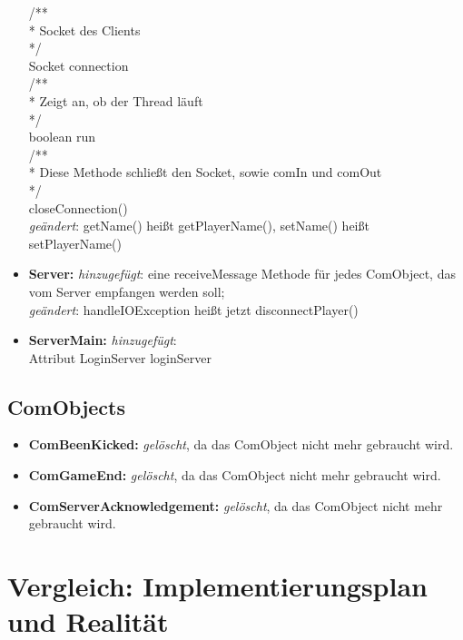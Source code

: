 \documentclass{article}
\begin{document}
\begin{itemize}
/**\\
 * Socket des Clients\\
 */\\
Socket connection\\
/**\\
 * Zeigt an, ob der Thread läuft\\
 */\\
boolean run\\
/**\\
 * Diese Methode schließt den Socket, sowie comIn und comOut\\
 */\\
closeConnection()\\

\textit{geändert}: getName() heißt getPlayerName(), setName() heißt setPlayerName()
\\
\item  \textbf{Server:} \textit{hinzugefügt}: eine receiveMessage Methode für jedes ComObject, das vom Server empfangen werden soll; \\
\textit{geändert}: handleIOException heißt jetzt disconnectPlayer()
\\
\item  \textbf{ServerMain:} \textit{hinzugefügt}:\\
 Attribut LoginServer loginServer\\
\end{itemize}

\subsection{ComObjects}

\begin{itemize}
\item \textbf{ComBeenKicked:} \textit{gelöscht}, da das ComObject nicht mehr gebraucht wird.\\
\item \textbf{ComGameEnd:} \textit{gelöscht}, da das ComObject nicht mehr gebraucht wird.\\
\item \textbf{ComServerAcknowledgement:} \textit{gelöscht}, da das ComObject nicht mehr gebraucht wird.\\

\end{itemize}

\newpage

\section{Vergleich: Implementierungsplan und Realität}
\end{document}
